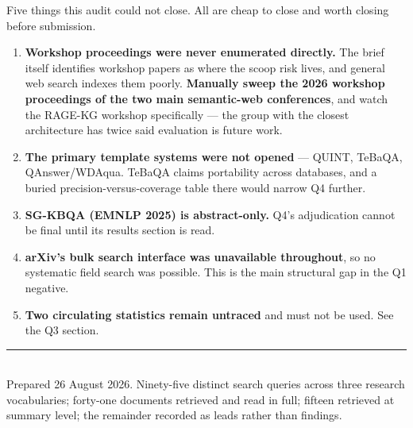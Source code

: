 \documentclass[11pt,a4paper]{article}
\begin{document}
Five things this audit could not close. All are cheap to close and worth closing
before submission.

\begin{enumerate}[itemsep=6pt]
\item \textbf{Workshop proceedings were never enumerated directly.} The brief itself
      identifies workshop papers as where the scoop risk lives, and general web search
      indexes them poorly. \textbf{Manually sweep the 2026 workshop proceedings of the
      two main semantic-web conferences}, and watch the RAGE-KG workshop specifically
      --- the group with the closest architecture has twice said evaluation is future
      work.
\item \textbf{The primary template systems were not opened} --- QUINT, TeBaQA,
      QAnswer/WDAqua. TeBaQA claims portability across databases, and a buried
      precision-versus-coverage table there would narrow Q4 further.
\item \textbf{SG-KBQA (EMNLP 2025) is abstract-only.} Q4's adjudication cannot be
      final until its results section is read.
\item \textbf{arXiv's bulk search interface was unavailable throughout}, so no
      systematic field search was possible. This is the main structural gap in the Q1
      negative.
\item \textbf{Two circulating statistics remain untraced} and must not be used. See
      the Q3 section.
\end{enumerate}

\vspace{1.2cm}
\begin{center}
\rule{0.5\textwidth}{0.4pt}\\[4mm]
{\small Prepared 26 August 2026. Ninety-five distinct search queries across three
research vocabularies; forty-one documents retrieved and read in full; fifteen
retrieved at summary level; the remainder recorded as leads rather than findings.}
\end{center}
\end{document}
